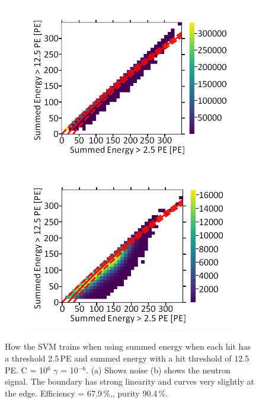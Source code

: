 \begin{figure}[!h]
\centering
\begin{subfigure}{.5\textwidth}
  \centering
  \includegraphics[width=\linewidth]{Appendix1/Figs/Sum1Sum2Noise.png}
  \captionsetup{width=.9\linewidth}
  \caption{}
  \label{subFig:Sum1Sum2N}
\end{subfigure}%
\begin{subfigure}{.5\textwidth}
  \centering
\includegraphics[width=\linewidth]{Appendix1/Figs/Sum1Sum2Signal.png}
  \captionsetup{width=.9\linewidth}
  \caption{}
  \label{subFig:Sum1Sum2S}
\end{subfigure}
\caption{How the SVM trains when using summed energy when each hit has a threshold 2.5\,PE and summed energy with a hit threshold of 12.5\,PE. C = 10$^6$ $\gamma$ = 10$^{-6}$. (a) Shows noise (b) shows the neutron signal. The boundary has strong linearity and curves very slightly at the edge. Efficiency = 67.9\,\%,, purity 90.4\,\%.}
\label{fig:Sum1Sum2SN}
\end{figure}

